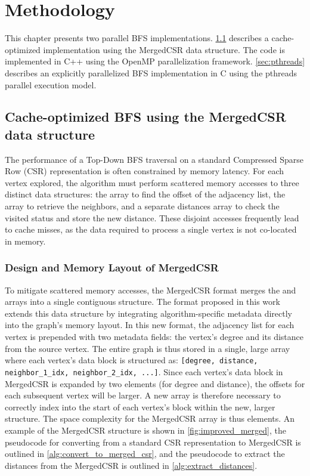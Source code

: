 \chapter{Methodology}
\label{cha:methodology}
This chapter presents two parallel BFS implementations. \cref{sec:mergedcsr} describes a cache-optimized implementation using the MergedCSR data structure. The code is implemented in C++ using the OpenMP parallelization framework. \cref{sec:pthreads} describes an explicitly parallelized BFS implementation in C using the pthreads parallel execution model.

\section{Cache-optimized BFS using the MergedCSR data structure}
\label{sec:mergedcsr}
The performance of a Top-Down BFS traversal on a standard Compressed Sparse Row (CSR) representation is often constrained by memory latency. For each vertex explored, the algorithm must perform scattered memory accesses to three distinct data structures: the \rowptr{} array to find the offset of the adjacency list, the \colidx{} array to retrieve the neighbors, and a separate distances array to check the visited status and store the new distance. These disjoint accesses frequently lead to cache misses, as the data required to process a single vertex is not co-located in memory.

\subsection{Design and Memory Layout of MergedCSR}

To mitigate scattered memory accesses, the MergedCSR format merges the \rowptr{} and \colidx{} arrays into a single contiguous structure. The format proposed in this work extends this data structure by integrating algorithm-specific metadata directly into the graph's memory layout. In this new format, the adjacency list for each vertex is prepended with two metadata fields: the vertex's degree and its distance from the source vertex. The entire graph is thus stored in a single, large array where each vertex's data block is structured as: \texttt{[degree, distance, neighbor\_1\_idx, neighbor\_2\_idx, ...]}. Since each vertex's data block in MergedCSR is expanded by two elements (for degree and distance), the offsets for each subsequent vertex will be larger. A new \rowptr{} array is therefore necessary to correctly index into the start of each vertex's block within the new, larger structure. The space complexity for the MergedCSR array is thus  elements. An example of the MergedCSR structure is shown in \cref{fig:improved_merged}, the pseudocode for converting from a standard CSR representation to MergedCSR is outlined in \cref{alg:convert_to_merged_csr}, and the pseudocode to extract the distances from the MergedCSR is outlined in \cref{alg:extract_distances}.

